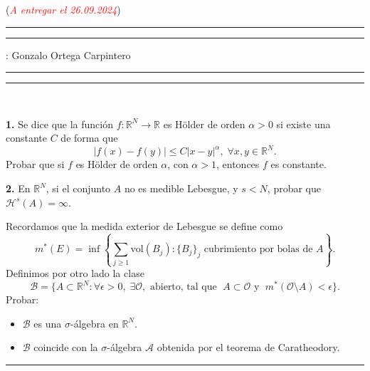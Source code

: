 \documentclass[11pt,a4paper,draft]{article}
\newcommand{\red}{\textcolor{red}}
\begin{document}
\hfill (\red{\it A entregar el 26.09.2024})
\hrule\hrule
\vspace{1mm}


\vspace{1mm}

 : Gonzalo Ortega Carpintero
\vspace{2mm}

\hrule\hrule

\vspace{2mm}

\

{\bf 1.} Se dice que la función $f:\mathbb R^N \to \mathbb R$ es H\"older de orden $\alpha>0$ si existe una constante $C$ de forma que
$$
|f(x)-f(y)|\le C|x-y|^\alpha, \; \forall x,y \in \mathbb R^N. 
$$
Probar que si $f$ es H\"older de orden $\alpha$, con $\alpha>1$, entonces $f$ es constante. 

\vskip 5mm

 {\bf 2.}  En $\mathbb R^N$, si el conjunto $A$ no es medible Lebesgue, y  $s<N$, probar que  $\mathcal{H}^s(A)=\infty$.
 
\vskip 5mm

  Recordamos que la medida exterior de Lebesgue se define como
 \vskip -3mm
 $$
 m^*(E)=\inf\left\{\sum_{j\ge 1} \mbox{vol}(B_j): \{B_j\}_j \mbox{ cubrimiento por bolas de } A\right\}. 
 $$
 \vskip -2mm
  Definimos por otro lado la clase
  $$
  \mathcal{B}=\{A\subset \mathbb R^N: \forall \epsilon>0, \; \exists \mathcal{O},  \mbox{ abierto, tal que }\; A\subset \mathcal{O} \mbox{ y } \; m^*(\mathcal{O}\setminus A)<\epsilon\}. 
  $$
Probar: 
\begin{itemize}
\item  $\mathcal{B}$ es una $\sigma$-\'algebra en $\mathbb R^N$.
\item  $\mathcal{B}$ coincide con la $\sigma$-\'algebra $\mathcal A$ obtenida por el teorema de Caratheodory. 
\end{itemize}

\vskip 1mm
\hrule
\vskip 3mm

 
\end{document}
